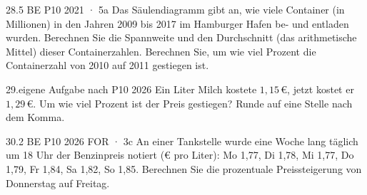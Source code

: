 \documentclass[11pt]{article}
\begin{document}
\begin{pfaufgabe}{28.}{5 BE \textperiodcentered{} P10 2021 · 5a}
Das Säulendiagramm gibt an, wie viele Container (in Millionen) in den Jahren 2009 bis 2017 im Hamburger Hafen be- und entladen wurden. Berechnen Sie die Spannweite und den Durchschnitt (das arithmetische Mittel) dieser Containerzahlen. Berechnen Sie, um wie viel Prozent die Containerzahl von 2010 auf 2011 gestiegen ist.
\par\smallskip\noindent {}\par
{}
\end{pfaufgabe}
\begin{pfaufgabe}{29.}{eigene Aufgabe nach P10 2026}
Ein Liter Milch kostete $1{,}15\,€$, jetzt kostet er $1{,}29\,€$. Um wie viel Prozent ist der Preis gestiegen? Runde auf eine Stelle nach dem Komma.
\end{pfaufgabe}
\begin{pfaufgabe}{30.}{2 BE \textperiodcentered{} P10 2026 FOR · 3c}
An einer Tankstelle wurde eine Woche lang täglich um 18 Uhr der Benzinpreis notiert (€ pro Liter): Mo 1,77, Di 1,78, Mi 1,77, Do 1,79, Fr 1,84, Sa 1,82, So 1,85. Berechnen Sie die prozentuale Preissteigerung von Donnerstag auf Freitag.
\end{pfaufgabe}
\end{document}
